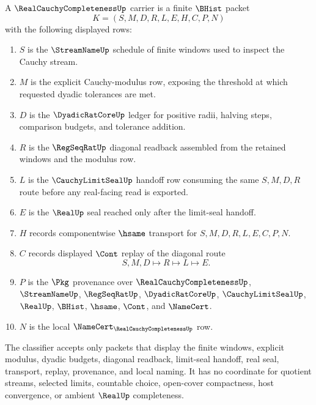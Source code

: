 \begin{definition}
\label{def:real-cauchy-completeness-carrier}
A $\RealCauchyCompletenessUp$ carrier is a finite $\BHist$ packet
$$
K=(S,M,D,R,L,E,H,C,P,N)
$$
with the following displayed rows:
\begin{enumerate}
\item $S$ is the $\StreamNameUp$ schedule of finite windows used to inspect the Cauchy stream.
\item $M$ is the explicit Cauchy-modulus row, exposing the threshold at which requested dyadic tolerances are met.
\item $D$ is the $\DyadicRatCoreUp$ ledger for positive radii, halving steps, comparison budgets, and tolerance addition.
\item $R$ is the $\RegSeqRatUp$ diagonal readback assembled from the retained windows and the modulus row.
\item $L$ is the $\CauchyLimitSealUp$ handoff row consuming the same $S,M,D,R$ route before any real-facing read is exported.
\item $E$ is the $\RealUp$ seal reached only after the limit-seal handoff.
\item $H$ records componentwise $\hsame$ transport for $S,M,D,R,L,E,C,P,N$.
\item $C$ records displayed $\Cont$ replay of the diagonal route
$$
S,M,D \longmapsto R \longmapsto L \longmapsto E .
$$
\item $P$ is the $\Pkg$ provenance over $\RealCauchyCompletenessUp$, $\StreamNameUp$, $\RegSeqRatUp$, $\DyadicRatCoreUp$, $\CauchyLimitSealUp$, $\RealUp$, $\BHist$, $\hsame$, $\Cont$, and $\NameCert$.
\item $N$ is the local $\NameCert_{\RealCauchyCompletenessUp}$ row.
\end{enumerate}
The classifier accepts only packets that display the finite windows, explicit modulus, dyadic budgets, diagonal readback, limit-seal handoff, real seal, transport, replay, provenance, and local naming. It has no coordinate for quotient streams, selected limits, countable choice, open-cover compactness, host convergence, or ambient $\RealUp$ completeness.
\end{definition}

